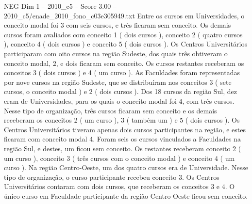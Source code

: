 \begin{textsample}{NEG Dim 1 – 2010\_c5 – Score 3.00 – 2010\_c5/enade\_2010\_fono\_c03e305949.txt}
Entre os cursos em Universidades, o conceito modal foi 3 com seis cursos, e três ficaram sem conceito.
Os demais cursos foram avaliados com conceito 1 ( dois cursos ), conceito 2 ( quatro cursos ), conceito 4 ( dois cursos ) e conceito 5 ( dois cursos ).
Os Centros Universitários participaram com oito cursos na região Sudeste, dos quais três obtiveram o conceito modal, 2, e dois ficaram sem conceito.
Os cursos restantes receberam os conceitos 3 ( dois cursos ) e 4 ( um curso ).
As Faculdades foram representadas por nove cursos na região Sudeste, que se distribuíram nos conceitos 3 ( sete cursos, o conceito modal ) e 2 ( dois cursos ).
Dos 18 cursos da região Sul, dez eram de Universidades, para os quais o conceito modal foi 4, com três cursos.
Nesse tipo de organização, três cursos ficaram sem conceito e os demais receberam os conceitos 2 ( um curso ), 3 ( também um ) e 5 ( dois cursos ).
Os Centros Universitários tiveram apenas dois cursos participantes na região, e estes ficaram com conceito modal 4.
Foram seis os cursos vinculados a Faculdades na região Sul, e destes, um ficou sem conceito.
Os restantes receberam conceito 2 ( um curso ), conceito 3 ( três cursos com o conceito modal ) e conceito 4 ( um curso ).
Na região Centro-Oeste, um dos quatro cursos era de Universidade.
Nesse tipo de organização, o curso participante recebeu conceito 3.
Os Centros Universitários contaram com dois cursos, que receberam os conceitos 3 e 4.
O único curso em Faculdade participante da região Centro-Oeste ficou sem conceito.

\end{textsample}

